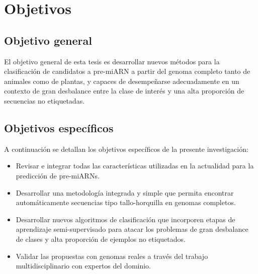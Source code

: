 \chapter{Objetivos}
\section{Objetivo general}

El objetivo general de esta tesis es desarrollar nuevos métodos para la clasificación de candidatos a pre-miARN a partir del  genoma completo tanto de
animales como de plantas, y capaces de desempeñarse adecuadamente en un contexto de gran desbalance entre la clase de interés y una alta proporción de
secuencias no etiquetadas.

\section{Objetivos específicos}

A continuación se detallan los objetivos específicos de la presente investigación:
\begin{itemize}
	\item Revisar e integrar todas las características utilizadas en la actualidad para la predicción de pre-miARNs.
	\item Desarrollar una metodología integrada y simple que permita encontrar automáticamente secuencias tipo tallo-horquilla en genomas completos.
	\item Desarrollar nuevos algoritmos de clasificación que incorporen etapas de aprendizaje semi-supervisado para atacar los problemas de gran
		desbalance de clases y alta proporción de ejemplos no etiquetados.
	\item Validar las propuestas con genomas reales a través del trabajo multidisciplinario con expertos del dominio.
\end{itemize}

